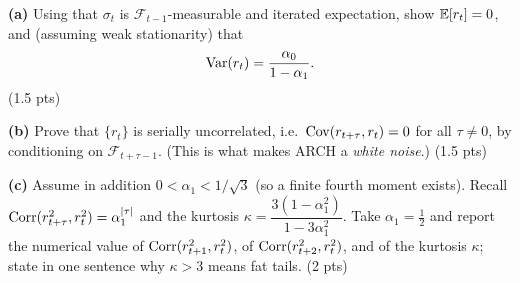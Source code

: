 \documentclass[11pt]{article}
\begin{document}
\textbf{(a)} Using that $\sigma_t$ is $\mathcal F_{t-1}$-measurable and iterated expectation, show $\mathbb{E}[r_t]=0$, and (assuming weak stationarity) that
\[
\operatorname{Var}(r_t)=\frac{\alpha_0}{1-\alpha_1}.
\]
\hfill(1.5 pts)

\textbf{(b)} Prove that $\{r_t\}$ is serially uncorrelated, i.e.\ $\operatorname{Cov}(r_{t+\tau},r_t)=0$ for all $\tau\neq0$, by conditioning on $\mathcal F_{t+\tau-1}$. (This is what makes ARCH a \emph{white noise}.) \hfill(1.5 pts)

\textbf{(c)} Assume in addition $0<\alpha_1<1/\sqrt3$ (so a finite fourth moment exists). Recall $\operatorname{Corr}(r_{t+\tau}^2,r_t^2)=\alpha_1^{\left\lvert \tau \right\rvert}$ and the kurtosis $\kappa=\dfrac{3(1-\alpha_1^2)}{1-3\alpha_1^2}$. Take $\alpha_1=\tfrac12$ and report the numerical value of $\operatorname{Corr}(r_{t+1}^2,r_t^2)$, of $\operatorname{Corr}(r_{t+2}^2,r_t^2)$, and of the kurtosis $\kappa$; state in one sentence why $\kappa>3$ means fat tails. \hfill(2 pts)
\answerpage
\end{document}
